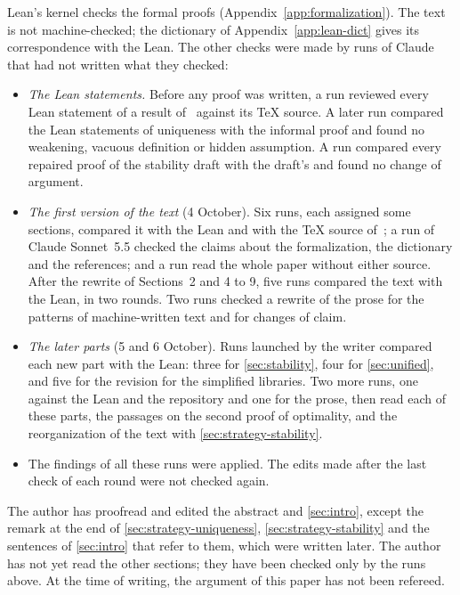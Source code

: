  Lean's kernel checks the formal proofs
(Appendix~\ref{app:formalization}). The text is not machine-checked; the
dictionary of Appendix~\ref{app:lean-dict} gives its correspondence with the
Lean. The other checks were made by runs of Claude that had not written what
they checked:
\begin{itemize}
\item \emph{The Lean statements.} Before any proof was written, a run reviewed
every Lean statement of a result of~\cite{Baek} against its TeX source. A later
run compared the Lean statements of uniqueness with the informal proof and found
no weakening, vacuous definition or hidden assumption. A run compared every
repaired proof of the stability draft with the draft's and found no change of
argument.
\item \emph{The first version of the text} (4 October). Six runs, each assigned
some sections, compared it with the Lean and with the TeX source of~\cite{Baek};
a run of Claude Sonnet~5.5 checked the claims about the formalization, the
dictionary and the references; and a run read the whole paper without either
source. After the rewrite of Sections~2 and 4 to 9, five runs compared the text
with the Lean, in two rounds. Two runs checked a rewrite of the prose for the
patterns of machine-written text and for changes of claim.
\item \emph{The later parts} (5 and 6 October). Runs launched by the writer
compared each new part with the Lean: three for \cref{sec:stability}, four for
\cref{sec:unified}, and five for the revision for the simplified libraries. Two
more runs, one against the Lean and the repository and one for the prose, then
read each of these parts, the passages on the second proof of optimality, and the
reorganization of the text with \cref{sec:strategy-stability}.
\item The findings of all these runs were applied. The edits made after the last
check of each round were not checked again.
\end{itemize}

 The author has proofread and edited the abstract
and \cref{sec:intro}, except the remark at the end of
\cref{sec:strategy-uniqueness}, \cref{sec:strategy-stability} and the sentences
of \cref{sec:intro} that refer to them, which were written later. The author has
not yet read the other sections; they have been checked only by the runs above.
At the time of writing, the argument of this paper has not been refereed.
